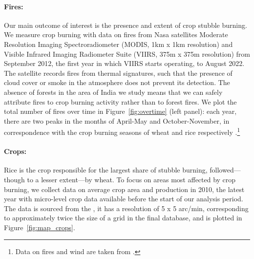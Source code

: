 \documentclass[12pt]{article}
\begin{document}
\paragraph{Fires:} Our main outcome of interest is the presence and extent of crop stubble burning. We measure crop burning with data on fires from Nasa satellites Moderate Resolution Imaging Spectroradiometer (MODIS, 1km x 1km resolution) and Visible Infrared Imaging Radiometer Suite (VIIRS, 375m x 375m resolution) from September 2012, the first year in which VIIRS starts operating, to August 2022. The satellite records fires from thermal signatures, such that the presence of cloud cover or smoke in the atmosphere does not prevent its detection. The absence of forests in the area of India we study means that we can safely attribute fires to crop burning activity rather than to forest fires. We plot the total number of fires over time in Figure~\ref{fig:overtime} (left panel): each year, there are two peaks in the months of April-May and October-November, in correspondence with the crop burning seasons of wheat and rice respectively \citep{singh2014crop}.\footnote{Data on fires and wind are taken from \citet{dipoppa2024bureaucrat}.}

\paragraph{Crops:} Rice is the crop responsible for the largest share of stubble burning, followed—though to a lesser extent—by wheat. To focus on areas most affected by crop burning, we collect data on average crop area and production in 2010, the latest year with micro-level crop data available before the start of our analysis period. The data is sourced from the \citet{fao_maps}, it has a resolution of 5 x 5 arc/min, corresponding to approximately twice the size of a grid in the final database, and is plotted in Figure~\ref{fig:map_crops}.
\end{document}
